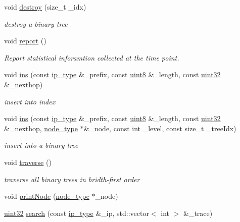 \begin{DoxyCompactItemize}
void \hyperlink{classRBTree_aef636adbe858181ebc0aeb49eb143a14}{destroy} (size\-\_\-t \-\_\-idx)
\begin{DoxyCompactList}\small\item\em destroy a binary tree \end{DoxyCompactList}\item 
void \hyperlink{classRBTree_a06d2d8d8c17af41cd5b1ea082cb1d81e}{report} ()
\begin{DoxyCompactList}\small\item\em Report statistical inforamtion collected at the time point. \end{DoxyCompactList}\item 
void \hyperlink{classRBTree_a06597dba808ee8528730113c4be8a64d}{ins} (const \hyperlink{classRBTree_ab52ca1695103152fd0b1c2b84a33db8b}{ip\-\_\-type} \&\-\_\-prefix, const \hyperlink{types_8h_a34ecedcf03a70dc91e4616212d79267d}{uint8} \&\-\_\-length, const \hyperlink{types_8h_abd01e8e67e3d94cab04ecaaf4f85ac1b}{uint32} \&\-\_\-nexthop)
\begin{DoxyCompactList}\small\item\em insert into index \end{DoxyCompactList}\item 
void \hyperlink{classRBTree_a7ee9ee342f4753d8230972a049268fb7}{ins} (const \hyperlink{classRBTree_ab52ca1695103152fd0b1c2b84a33db8b}{ip\-\_\-type} \&\-\_\-prefix, const \hyperlink{types_8h_a34ecedcf03a70dc91e4616212d79267d}{uint8} \&\-\_\-length, const \hyperlink{types_8h_abd01e8e67e3d94cab04ecaaf4f85ac1b}{uint32} \&\-\_\-nexthop, \hyperlink{classRBTree_a34cd65cfffec3d99e0a73deafa471078}{node\-\_\-type} $\ast$\&\-\_\-node, const int \-\_\-level, const size\-\_\-t \-\_\-tree\-Idx)
\begin{DoxyCompactList}\small\item\em insert into a binary tree \end{DoxyCompactList}\item 
void \hyperlink{classRBTree_a88efff50f76f335f776615120b9da902}{traverse} ()
\begin{DoxyCompactList}\small\item\em traverse all binary trees in bridth-\/first order \end{DoxyCompactList}\item 
void \hyperlink{classRBTree_a845b26ba16966c2de2100cc94985505f}{print\-Node} (\hyperlink{classRBTree_a34cd65cfffec3d99e0a73deafa471078}{node\-\_\-type} $\ast$\-\_\-node)
\item 
\hyperlink{types_8h_abd01e8e67e3d94cab04ecaaf4f85ac1b}{uint32} \hyperlink{classRBTree_a14c7a40c80b6446738568cf06aee31f2}{search} (const \hyperlink{classRBTree_ab52ca1695103152fd0b1c2b84a33db8b}{ip\-\_\-type} \&\-\_\-ip, std\-::vector$<$ int $>$ \&\-\_\-trace)

\end{DoxyCompactItemize}
